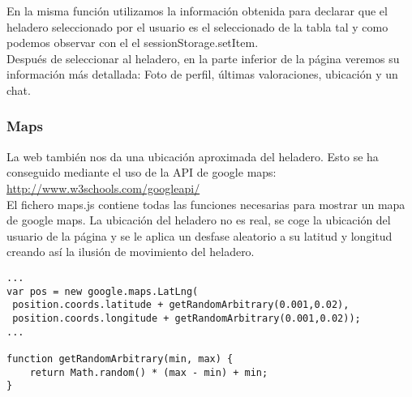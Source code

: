 \documentclass[11pt,a4paper]{article}
\begin{document}
En la misma función utilizamos la información obtenida para declarar que el heladero seleccionado por el usuario es el seleccionado de la tabla tal y como podemos observar con el el sessionStorage.setItem.\\
Después de seleccionar al heladero, en la parte inferior de la página veremos su información más detallada: Foto de perfil, últimas valoraciones, ubicación y un chat.\\

\subsubsection{Maps}
La web también nos da una ubicación aproximada del heladero. Esto se ha conseguido mediante el uso de la API de google maps: \url{http://www.w3schools.com/googleapi/}\\

El fichero maps.js contiene todas las funciones necesarias para mostrar un mapa de google maps. La ubicación del heladero no es real, se coge la ubicación del usuario de la página y se le aplica un desfase aleatorio a su latitud y longitud creando así la ilusión de movimiento del heladero.\\
\begin{lstlisting}
...
var pos = new google.maps.LatLng(
 position.coords.latitude + getRandomArbitrary(0.001,0.02),
 position.coords.longitude + getRandomArbitrary(0.001,0.02));
...

function getRandomArbitrary(min, max) {
    return Math.random() * (max - min) + min;
}
\end{lstlisting}
\end{document}
